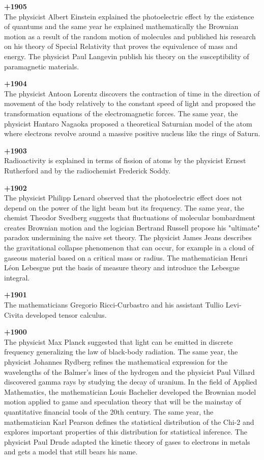 \textbf{+1905}\\
The physicist Albert Einstein explained the photoelectric effect by the existence of quantums and the same year he explained mathematically the Brownian motion as a result of the random motion of molecules and published his research on his theory of Special Relativity that proves the equivalence of mass and energy. The physicist Paul Langevin publish his theory on the susceptibility of paramagnetic materials.

\textbf{+1904}\\
The physicist Antoon Lorentz discovers the contraction of time in the direction of movement of the body relatively to the constant speed of light and proposed the transformation equations of the electromagnetic forces. The same year, the physicist Hantaro Nagaoka proposed a theoretical Saturnian model of the atom where electrons revolve around a massive positive nucleus like the rings of Saturn.

\textbf{+1903}\\
Radioactivity is explained in terms of fission of atoms by the physicist Ernest Rutherford and by the radiochemist Frederick Soddy.

\textbf{+1902}\\
The physicist Philipp Lenard observed that the photoelectric effect does not depend on the power of the light beam but its frequency. The same year, the chemist Theodor Svedberg suggests that fluctuations of molecular bombardment creates Brownian motion and the logician Bertrand Russell propose his "ultimate" paradox undermining the naive set theory. The physicist James Jeans describes the gravitational collapse phenomenon that can occur, for example in a cloud of gaseous material based on a critical mass or radius. The mathematician Henri Léon Lebesgue put the basis of measure theory and introduce the Lebesgue integral.

\textbf{+1901}\\
The mathematicians Gregorio Ricci-Curbastro and his assistant Tullio Levi-Civita developed tensor calculus.

\textbf{+1900}\\
The physicist Max Planck suggested that light can be emitted in discrete frequency generalizing the law of black-body radiation. The same year, the physicist Johannes Rydberg refines the mathematical expression for the wavelengths of the Balmer's lines of the hydrogen and the physicist Paul Villard discovered gamma rays by studying the decay of uranium. In the field of Applied Mathematics, the mathematician Louis Bachelier developed the Brownian model motion applied to game and speculation theory that will be the mainstay of quantitative financial tools of the 20th century. The same year, the mathematician Karl Pearson defines the statistical distribution of the Chi-2 and explores important properties of this distribution for statistical inference. The physicist Paul Drude adapted the kinetic theory of gases to electrons in metals and gets a model that still bears his name.


